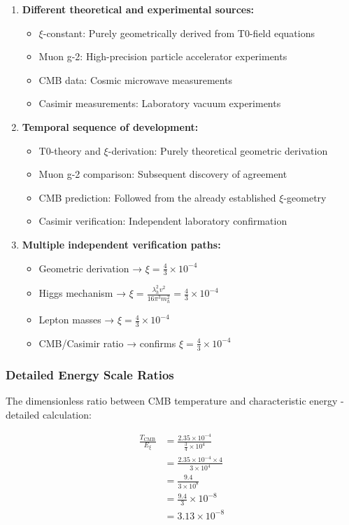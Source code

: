 \documentclass[12pt,a4paper]{article}
\theoremstyle{definition}
\theoremstyle{remark}
\begin{document}
	\begin{enumerate}
		\item \textbf{Different theoretical and experimental sources:}
		\begin{itemize}
			\item $\xi$-constant: Purely geometrically derived from T0-field equations
			\item Muon g-2: High-precision particle accelerator experiments
			\item CMB data: Cosmic microwave measurements
			\item Casimir measurements: Laboratory vacuum experiments
		\end{itemize}
		
		\item \textbf{Temporal sequence of development:}
		\begin{itemize}
			\item T0-theory and $\xi$-derivation: Purely theoretical geometric derivation
			\item Muon g-2 comparison: Subsequent discovery of agreement
			\item CMB prediction: Followed from the already established $\xi$-geometry
			\item Casimir verification: Independent laboratory confirmation
		\end{itemize}
		
		\item \textbf{Multiple independent verification paths:}
		\begin{itemize}
			\item Geometric derivation → $\xi = \frac{4}{3} \times 10^{-4}$
			\item Higgs mechanism → $\xi = \frac{\lambda_h^2 v^2}{16\pi^3 m_h^2} = \frac{4}{3} \times 10^{-4}$
			\item Lepton masses → $\xi = \frac{4}{3} \times 10^{-4}$
			\item CMB/Casimir ratio → confirms $\xi = \frac{4}{3} \times 10^{-4}$
		\end{itemize}
	\end{enumerate}
	
	\subsubsection{Detailed Energy Scale Ratios}
	
	The dimensionless ratio between CMB temperature and characteristic energy - detailed calculation:
	
	\begin{align}
		\frac{T_{\text{CMB}}}{E_\xi} &= \frac{2.35 \times 10^{-4}}{\frac{3}{4} \times 10^4} \\
		&= \frac{2.35 \times 10^{-4} \times 4}{3 \times 10^4} \\
		&= \frac{9.4}{3 \times 10^8} \\
		&= \frac{9.4}{3} \times 10^{-8} \\
		&= 3.13 \times 10^{-8}
	\end{align}
	
\end{document}
